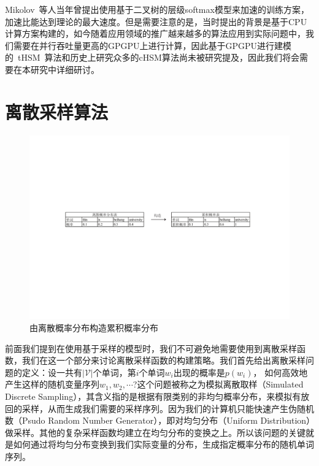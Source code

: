 Mikolov~等人当年曾提出使用基于二叉树的层级softmax模型来加速的训练方案，加速比能达到理论的最大速度。但是需要注意的是，当时提出的背景是基于CPU计算方案构建的，如今随着应用领域的推广越来越多的算法应用到实际问题中，我们需要在并行吞吐量更高的GPGPU上进行计算，因此基于GPGPU进行建模的~tHSM~算法和历史上研究众多的cHSM算法尚未被研究提及，因此我们将会需要在本研究中详细研讨。

\section{离散采样算法}
\begin{figure}[!b]
  \centering
\includegraphics[width=1\linewidth]{./figures/cdfreverse.pdf}
\caption{由离散概率分布构造累积概率分布}\label{fig:cdf_reverse}
\end{figure}


前面我们提到在使用基于采样的模型时，我们不可避免地需要使用到离散采样函数，我们在这一个部分来讨论离散采样函数的构建策略。我们首先给出离散采样问题的定义：设一共有$|\mathcal{V}|$个单词，第$i$个单词$w_i$出现的概率是$p(w_i)$， 如何高效地产生这样的随机变量序列$w_1,w_2,\cdots$?这个问题被称之为模拟离散取样（Simulated Discrete Sampling），其含义指的是根据有限类别的非均匀概率分布，来模拟有放回的采样，从而生成我们需要的采样序列。因为我们的计算机只能快速产生伪随机数（Psudo Random Number Generator），即对均匀分布（Uniform Distribution）做采样。其他的复杂采样函数均建立在均匀分布的变换之上。所以该问题的关键就是如何通过将均匀分布变换到我们实际变量的分布，生成指定概率分布的随机单词序列。

